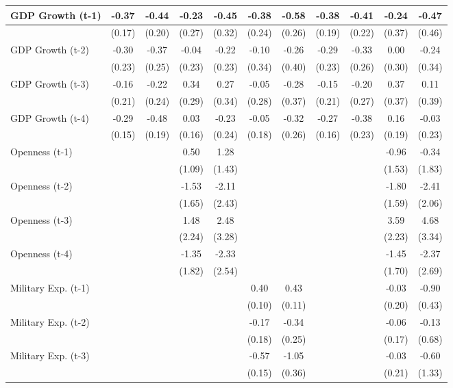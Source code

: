 \begin{tabular}{lcccccccccc}
\toprule
GDP Growth (t-1) & -0.37 & -0.44 & -0.23 & -0.45 & -0.38 & -0.58 & -0.38 & -0.41 & -0.24 & -0.47 \\
\midrule
& (0.17) & (0.20) & (0.27) & (0.32) & (0.24) & (0.26) & (0.19) & (0.22) & (0.37) & (0.46) \\
GDP Growth (t-2) & -0.30 & -0.37 & -0.04 & -0.22 & -0.10 & -0.26 & -0.29 & -0.33 & 0.00 & -0.24 \\
& (0.23) & (0.25) & (0.23) & (0.23) & (0.34) & (0.40) & (0.23) & (0.26) & (0.30) & (0.34) \\
GDP Growth (t-3) & -0.16 & -0.22 & 0.34 & 0.27 & -0.05 & -0.28 & -0.15 & -0.20 & 0.37 & 0.11 \\
& (0.21) & (0.24) & (0.29) & (0.34) & (0.28) & (0.37) & (0.21) & (0.27) & (0.37) & (0.39) \\
GDP Growth (t-4) & -0.29 & -0.48 & 0.03 & -0.23 & -0.05 & -0.32 & -0.27 & -0.38 & 0.16 & -0.03 \\
& (0.15) & (0.19) & (0.16) & (0.24) & (0.18) & (0.26) & (0.16) & (0.23) & (0.19) & (0.23) \\
Openness (t-1) &  &  & 0.50 & 1.28 &  &  &  &  & -0.96 & -0.34 \\
&  &  & (1.09) & (1.43) &  &  &  &  & (1.53) & (1.83) \\
Openness (t-2) &  &  & -1.53 & -2.11 &  &  &  &  & -1.80 & -2.41 \\
&  &  & (1.65) & (2.43) &  &  &  &  & (1.59) & (2.06) \\
Openness (t-3) &  &  & 1.48 & 2.48 &  &  &  &  & 3.59 & 4.68 \\
&  &  & (2.24) & (3.28) &  &  &  &  & (2.23) & (3.34) \\
Openness (t-4) &  &  & -1.35 & -2.33 &  &  &  &  & -1.45 & -2.37 \\
&  &  & (1.82) & (2.54) &  &  &  &  & (1.70) & (2.69) \\
Military Exp. (t-1) &  &  &  &  & 0.40 & 0.43 &  &  & -0.03 & -0.90 \\
&  &  &  &  & (0.10) & (0.11) &  &  & (0.20) & (0.43) \\
Military Exp. (t-2) &  &  &  &  & -0.17 & -0.34 &  &  & -0.06 & -0.13 \\
&  &  &  &  & (0.18) & (0.25) &  &  & (0.17) & (0.68) \\
Military Exp. (t-3) &  &  &  &  & -0.57 & -1.05 &  &  & -0.03 & -0.60 \\
&  &  &  &  & (0.15) & (0.36) &  &  & (0.21) & (1.33) \\

\end{tabular}
